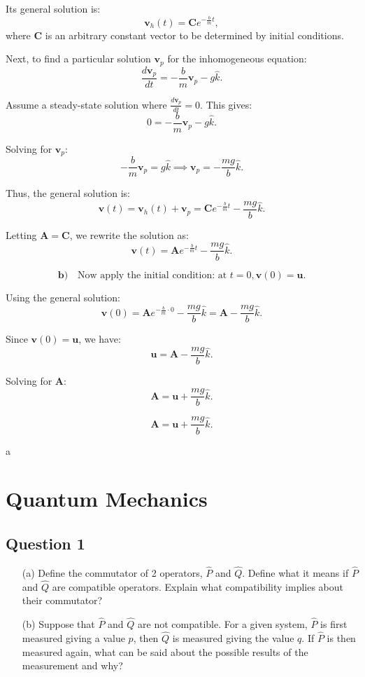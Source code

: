 \documentclass{article}
\begin{document}
Its general solution is:
\[
\mathbf{v}_h(t) = \mathbf{C} e^{-\frac{b}{m}t},
\]
where \(\mathbf{C}\) is an arbitrary constant vector to be determined by initial conditions.

Next, to find a particular solution \(\mathbf{v}_p\) for the inhomogeneous equation:
\[
\frac{d\mathbf{v}_p}{dt} = -\frac{b}{m}\mathbf{v}_p - g\hat{k}.
\]

Assume a steady-state solution where \(\frac{d\mathbf{v}_p}{dt}=0\). This gives:
\[
0 = -\frac{b}{m}\mathbf{v}_p - g\hat{k}.
\]

Solving for \(\mathbf{v}_p\):
\[
-\frac{b}{m}\mathbf{v}_p = g\hat{k} \implies \mathbf{v}_p = -\frac{mg}{b}\hat{k}.
\]

Thus, the general solution is:
\[
\mathbf{v}(t) = \mathbf{v}_h(t) + \mathbf{v}_p = \mathbf{C}e^{-\frac{b}{m}t} - \frac{mg}{b}\hat{k}.
\]

Letting \(\mathbf{A} = \mathbf{C}\), we rewrite the solution as:
\[
\mathbf{v}(t) = \mathbf{A}e^{-\frac{b}{m}t} - \frac{mg}{b}\hat{k}.
\]

\[
\textbf{b)} \quad \text{Now apply the initial condition: at } t=0, \mathbf{v}(0)=\mathbf{u}.
\]

Using the general solution:
\[
\mathbf{v}(0) = \mathbf{A}e^{-\frac{b}{m}\cdot 0} - \frac{mg}{b}\hat{k} = \mathbf{A} - \frac{mg}{b}\hat{k}.
\]

Since \(\mathbf{v}(0)=\mathbf{u}\), we have:
\[
\mathbf{u} = \mathbf{A} - \frac{mg}{b}\hat{k}.
\]

Solving for \(\mathbf{A}\):
\[
\mathbf{A} = \mathbf{u} + \frac{mg}{b}\hat{k}.
\]

\[
\boxed{\mathbf{A} = \mathbf{u} + \frac{mg}{b}\hat{k}}.
\]

a\section{Quantum Mechanics}

\subsection{Question 1}
\begin{enumerate}
    \item[(a)] Define the commutator of 2 operators, $\hat{P}$ and $\hat{Q}$. Define what it means if $\hat{P}$ and $\hat{Q}$ are compatible operators. Explain what compatibility implies about their commutator?
    \item[(b)] Suppose that $\hat{P}$ and $\hat{Q}$ are not compatible. For a given system, $\hat{P}$ is first measured giving a value $p$, then $\hat{Q}$ is measured giving the value $q$. If $\hat{P}$ is then measured again, what can be said about the possible results of the measurement and why?
\end{enumerate}
\end{document}
